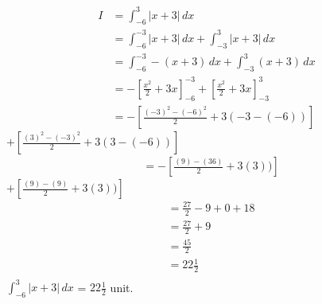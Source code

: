 \documentclass[12pt]{IEEEtran}
\begin{document}
    \begin{align}
        I&=\int_{-6}^{3} |x+3| \,dx \\
        &= \int_{-6}^{-3} |x+3| \,dx  +  \int_{-3}^{3} |x+3| \,dx \\
        &= \int_{-6}^{-3} -(x+3) \,dx  +  \int_{-3}^{3} (x+3) \,dx \\
        &= -\left[\frac{x^2}{2}+3x\right]_{-6}^{-3} + \left[\frac{x^2}{2}+3x\right]_{-3}^{3}\\
        &=-\left[\frac{(-3)^2-(-6)^2}{2}+3(-3-(-6))\right]
    \end{align}
    $+\left[\frac{(3)^2-(-3)^2}{2} +3(3-(-6))\right]$\\
    \begin{align}
        &=-\left[\frac{(9)-(36)}{2} +3(3))\right]
    \end{align}
    $+\left[\frac{(9)-(9)}{2} +3(3))\right]$\\
    \begin{align}
        &=\frac{27}{2}-9+0+18\\
        &=\frac{27}{2}+9\\
        &=\frac{45}{2}\\
        &=22\frac{1}{2}\\
    \end{align}
    \implies $ \int_{-6}^{3} |x+3| \,dx $ = $22\frac{1}{2}$ unit.\\
\end{document}
